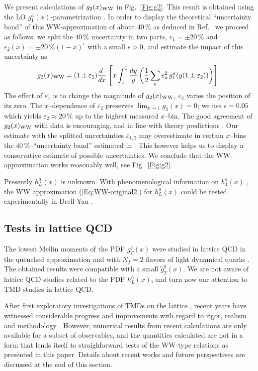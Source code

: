 \documentclass[a4paper,11pt]{article}
\newcommand{\blue}[1]{{\color{blue} #1}}
\newcommand{\be}{\begin{equation}}
\newcommand{\ee}{\end{equation}}
\newcommand{\ps}[1]{\blue{ #1}}
\begin{document}
We present calculations of $g_2(x)_{\rm WW}$ in Fig.~\ref{Fig:g2}.
\ps{This result is obtained using the LO $g_1^a(x)$-parametrization 
\cite{Gluck:1998xa}. In order to display the theoretical ``uncertainty 
band'' of this WW-approximation of about $40\,\%$ as deduced in 
Ref.~\cite{Accardi:2009au} we proceed as follows: we split the 
$40\,\%$ uncertainty} in two parts, $\varepsilon_1=\pm 20\,\%$ and 
$\varepsilon_2(x)=\pm 20\,\%(1-x)^\epsilon$ with a small $\epsilon>0$,
and estimate the impact of this uncertainty as 
\be\label{Eq:g2-in-WW-model-violation}
    g_2(x)_{\rm WW} = (1\pm\varepsilon_1)\frac{ d\;}{ d x}\;\Biggl[
    x\int_x^1\frac{ d y}{y} \,\biggl(
    \frac12\sum_ae_a^2\,g_1^a(y(1\pm\varepsilon_2))\biggr)\Biggr]\,.
\ee
The effect of $\varepsilon_1$ is to change the magnitude
of $g_2(x)_{\rm WW}$, $\varepsilon_2$ varies the position of its zero.
The $x$--dependence of $\varepsilon_2$ preserves $\lim_{x\to1}g_2(x)= 0$; 
we use $\epsilon=0.05$ which yields $\varepsilon_2\approx 20\,\%$ up to 
the highest measured $x$--bin.
The good agreement of $g_2(x)_{\rm WW}$ with data is encouraging,
and in line with theory predictions \cite{Balla:1997hf}.
Our estimate with the splitted uncertainties 
$\varepsilon_{1,2}$ may overestimate in certain $x$--bins the 
$40\,\%$--``uncertainty band'' estimated in \cite{Accardi:2009au}. 
This however helps us to display a conservative estimate of possible 
uncertainties. 
We conclude that the WW--approximation works reasonably well, 
see Fig.~\ref{Fig:g2}.

Presently $h_L^a(x)$ is unknown.
With phenomenological information on $h_1^a(x)$
\cite{Efremov:2006qm,Anselmino:2007fs,Anselmino:2008jk}, 
the WW approximation (\ref{Eq:WW-original2}) for $h_L^a(x)$ could 
be tested experimentally in Drell-Yan \cite{Koike:2008du}.


\subsection{Tests in lattice QCD}
\label{Sec-3.5:WW-lattice}

The lowest Mellin moments of the PDF $g_T^q(x)$ were studied in
lattice QCD in the quenched approximation \cite{Gockeler:2000ja} 
and with $N_f = 2$ flavors of light dynamical quarks \cite{Gockeler:2005vw}.
The obtained results were compatible with a small $\tilde{g}_T^q(x)$. 
We are not aware of lattice QCD studies related to the PDF $h_L^a(x)$,
and turn now our attention to TMD studies in lattice QCD.

After first exploratory investigations of TMDs on the lattice
\cite{Hagler:2009mb,Musch:2010ka}, recent years have witnessed considerable
progress and improvements with regard to rigor, realism and methodology
\cite{Yoon:2017qzo, %
Engelhardt:2015xja,%
Ji:2014hxa,%
Musch:2011er%
}.
However, numerical results from recent calculations are only available 
for a subset of observables, and the quantities calculated are not in a 
form that lends itself to straighforward tests of the WW-type relations 
as presented in this paper. Details about recent works and future 
perspectives are discussed at the end of this section.
\end{document}
